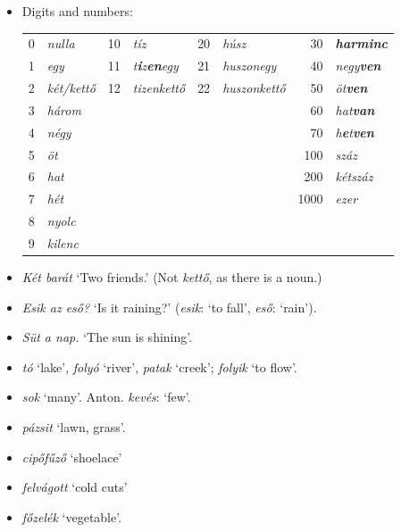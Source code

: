 \documentclass[a4paper,11pt]{article}
\begin{document}
\begin{itemize}
  \item Digits and numbers:\\[2mm]
    \begin{tabular}{@{}rlrlrlrl@{}}
      0 & \emph{nulla}     & 10 & \emph{tíz}        & 20 & \emph{húsz} &
      30 & \emph{\textbf{harminc}} \\
      1 & \emph{egy}       & 11 & \emph{t\textbf{i}z\textbf{en}egy}   & 21 &
      \emph{huszonegy} &
      40 & \emph{negy\textbf{ven}}\\
      2 & \emph{két/kettő} & 12 & \emph{tizenkettő} & 22 &
      \emph{huszonkettő} &
      50 & \emph{öt\textbf{ven}}\\
      3 & \emph{három} & & & & & 60 & \emph{hat\textbf{van}}\\
      4 & \emph{négy} & & & & & 70 & \emph{h\textbf{e}t\textbf{ven}}\\
      5 & \emph{öt} & & & & & 100 & \emph{száz}\\
      6 & \emph{hat} & & & & & 200 & \emph{kétszáz}\\
      7 & \emph{hét} & & & & & 1000 & \emph{ezer}\\
      8 & \emph{nyolc} \\
      9 & \emph{kilenc}
    \end{tabular}

  \item \emph{Két barát} `Two friends.' (Not \emph{kettő}, as there
    is a noun.)

  \item \emph{Esik az eső?} `Is it raining?' (\emph{esik}: `to fall',
    \emph{eső}: `rain').

  \item \emph{Süt a nap.} `The sun is shining'.

  \item \emph{tó} `lake', \emph{folyó} `river', \emph{patak}
    `creek'; \emph{folyik} `to flow'.

  \item \emph{sok} `many'. Anton. \emph{kevés}: `few'.

  \item \emph{pázsit} `lawn, grass'.

  \item \emph{cipőfűző} `shoelace'

  \item \emph{felvágott} `cold cuts'

  \item \emph{főzelék} `vegetable'.


\end{itemize}
\end{document}
